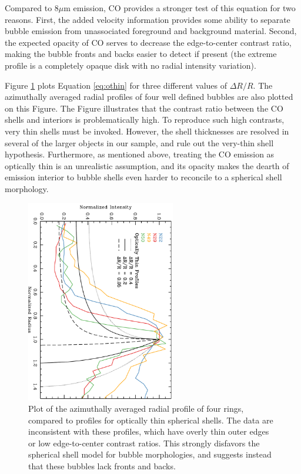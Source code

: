 Compared to $8 \mu$m emission, CO provides a stronger test of this equation for two reasons. First, the
added velocity information provides some ability to separate bubble emission from unassociated
foreground and background material. Second, the expected opacity of CO serves to decrease
the edge-to-center contrast ratio, making the bubble fronts and backs easier to detect if present
(the extreme profile is a completely opaque disk with no radial intensity variation).

Figure \ref{fig:contrast} plots Equation \ref{eq:othin} for three different
values of $\Delta R / R$. The azimuthally averaged radial
profiles of four well defined bubbles are also plotted on this
Figure. The Figure illustrates that the contrast ratio between
the CO shells and interiors is problematically high. To reproduce such high contrasts, very thin shells must be invoked.
However, the shell thicknesses are resolved in several of the larger objects in our sample,
and rule out the very-thin shell hypothesis. Furthermore, as mentioned above, treating the CO emission
as optically thin is an unrealistic assumption, and its opacity makes the dearth of emission interior to
bubble shells even harder to reconcile to a spherical shell morphology.

\begin{figure}
\includegraphics[height=3.5in, angle=90]{contrast}
\caption{Plot of the azimuthally averaged radial profile of four rings, compared to
profiles for optically thin spherical shells. The data are inconsistent with these profiles, which have overly thin outer
edges or low edge-to-center contrast ratios. This strongly disfavors the spherical shell model for bubble morphologies, and suggests instead that
these bubbles lack fronts and backs.}
\label{fig:contrast}
\end{figure}


